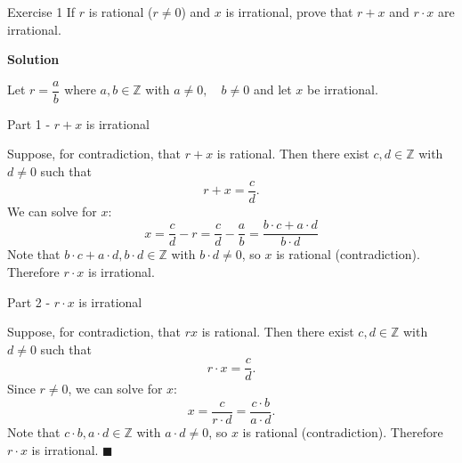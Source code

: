 \documentclass[12pt, a4paper]{article}
\begin{document}
\thispagestyle{fancy}

\begin{exercisebox}{Exercise 1}
    If $r$ is rational ($r \neq 0$) and $x$ is irrational, prove that $r+x$ and $r \cdot x$ are irrational.
\end{exercisebox}

\textbf{Solution}

Let $r=\dfrac{a}{b}$ where $a,b \in \mathbb{Z}$ with $a\neq 0,\quad b\neq 0$ and let $x$ be irrational.

Part 1 - $r+x$ is irrational 

Suppose, for contradiction, that $r+ x$ is rational. Then there exist $c,d\in \mathbb{Z}$ with $d\neq 0$ such that
\[
r + x = \frac{c}{d}.
\]
We can solve for $x$:
\[
x = \frac{c}{d} - r= \frac{c}{d}-\frac{a}{b}=\frac{b\cdot c+a\cdot d}{b\cdot d}
\]
Note that $b\cdot c+a\cdot d, b \cdot d\in \mathbb{Z}$ with $b\cdot d \neq 0$, so $x$ is rational (contradiction).
Therefore $r \cdot x$ is irrational. 

Part 2 - $r\cdot x$ is irrational

Suppose, for contradiction, that $rx$ is rational. Then there exist $c,d\in \mathbb{Z}$ with $d\neq 0$ such that
\[
r \cdot x = \frac{c}{d}.
\]
Since $r\neq 0$, we can solve for $x$:
\[
x = \frac{c}{r\cdot d} = \frac{c\cdot b}{a \cdot d}.
\]
Note that $c\cdot b, a \cdot d\in \mathbb{Z}$ with $a \cdot d \neq 0$, so $x$ is rational (contradiction).
Therefore $r \cdot x$ is irrational. $\blacksquare$
\end{document}
